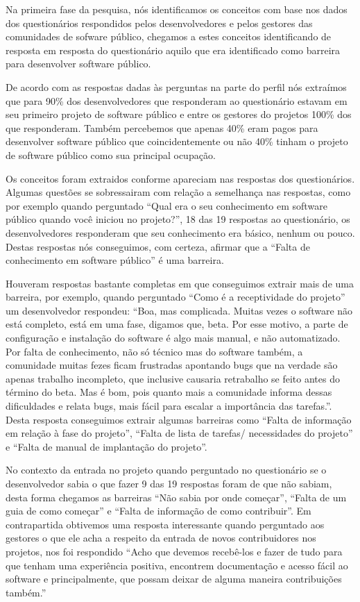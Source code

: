 Na primeira fase da pesquisa, nós identificamos os conceitos com base nos dados 
dos questionários respondidos pelos desenvolvedores e pelos gestores das comunidades de
sofware público, chegamos a estes conceitos identificando de resposta em resposta 
do questionário aquilo que era identificado como barreira para desenvolver 
software público.

De acordo com as respostas dadas às perguntas na parte do perfil nós extraímos
que para 90\% dos desenvolvedores que responderam ao questionário estavam 
em seu primeiro projeto de software público e entre os gestores do projetos
100\% dos que responderam. Também percebemos que apenas
40\% eram pagos para desenvolver software público que coincidentemente ou não
40\% tinham o projeto de software público como sua principal ocupação.

Os conceitos foram extraidos conforme apareciam nas respostas dos questionários.
Algumas questões se sobressairam com relação a semelhança nas respostas, como 
por exemplo quando perguntado ``Qual era o seu conhecimento em software público 
quando você iniciou no projeto?'', 18 das 19 respostas ao questionário, os desenvolvedores
responderam que seu conhecimento era básico, nenhum ou pouco. Destas respostas 
nós conseguimos, com certeza, afirmar que a ``Falta de conhecimento em software público''
é uma barreira.

Houveram respostas bastante completas em que conseguimos extrair mais de uma barreira,
por exemplo, quando perguntado ``Como é a receptividade do projeto'' um desenvolvedor
respondeu: ``Boa, mas complicada. Muitas vezes o software não está completo, está em uma 
fase, digamos que, beta. Por esse motivo, a parte de configuração e instalação 
do software é algo mais manual, e não automatizado. Por falta de conhecimento, 
não só técnico mas do software também, a comunidade muitas fezes ficam frustradas 
apontando bugs que na verdade são apenas trabalho incompleto, que inclusive 
causaria retrabalho se feito antes do término do beta. Mas é bom, pois quanto mais 
a comunidade informa dessas dificuldades e relata bugs, mais fácil para escalar a 
importância das tarefas.''. Desta resposta conseguimos extrair algumas barreiras 
como ``Falta de informação em relação à fase do projeto'', ``Falta de lista de tarefas/
necessidades do projeto'' e ``Falta de manual de implantação do projeto''.

No contexto da entrada no projeto quando perguntado no questionário se o desenvolvedor
sabia o que fazer 9 das 19 respostas foram de que não sabiam, desta forma chegamos as
barreiras ``Não sabia por onde começar'', ``Falta de um guia de como começar'' e ``Falta de 
informação de como contribuir''. Em contrapartida obtivemos uma resposta interessante 
quando perguntado aos gestores o que ele acha a respeito da entrada de novos contribuidores
nos projetos, nos foi respondido ``Acho que devemos recebê-los e fazer de tudo 
para que tenham uma experiência positiva, encontrem documentação e acesso fácil ao 
software e principalmente, que possam deixar de alguma maneira contribuições também.''

